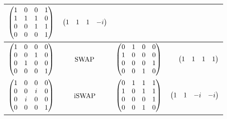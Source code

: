 \documentclass[a4paper,english]{scrartcl}
\begin{document}
\begin{proposition}
\begin{table}[H]
\begin{tabular}{lccr}
  $\begin{pmatrix}1&0&0&1\\1&1&1&0\\0&0&1&1\\0&0&0&1\end{pmatrix}$ & $\begin{pmatrix}1&1&1&-i\end{pmatrix}$\\
  \midrule
  $\begin{pmatrix}1&0&0&0\\0&0&1&0\\0&1&0&0\\0&0&0&1\end{pmatrix}$ & $\Swap$ &
  $\begin{pmatrix}0&1&0&0\\1&0&0&0\\0&0&0&1\\0&0&1&0\end{pmatrix}$ & $\begin{pmatrix}1&1&1&1\end{pmatrix}$\\
  \midrule
  $\begin{pmatrix}1&0&0&0\\0&0&i&0\\0&i&0&0\\0&0&0&1\end{pmatrix}$ & $\iSwap$ &
  $\begin{pmatrix}0&1&1&1\\1&0&1&1\\0&0&0&1\\0&0&1&0\end{pmatrix}$ & $\begin{pmatrix}1&1&-i&-i\end{pmatrix}$\\
  \bottomrule
\end{tabular}
\end{table}
\end{proposition}
\end{document}
